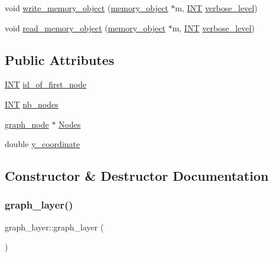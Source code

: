 \begin{DoxyCompactItemize}
\item 
void \mbox{\hyperlink{classgraph__layer_ac04a5403f452bec70405cec8a75ee6e7}{write\+\_\+memory\+\_\+object}} (\mbox{\hyperlink{classmemory__object}{memory\+\_\+object}} $\ast$m, \mbox{\hyperlink{galois_8h_a09fddde158a3a20bd2dcadb609de11dc}{I\+NT}} \mbox{\hyperlink{simeon_8_c_a818073fbcc2f439e7c56952f67386122}{verbose\+\_\+level}})
\item 
void \mbox{\hyperlink{classgraph__layer_aed94444b08a552c31e8b887c04a33b7f}{read\+\_\+memory\+\_\+object}} (\mbox{\hyperlink{classmemory__object}{memory\+\_\+object}} $\ast$m, \mbox{\hyperlink{galois_8h_a09fddde158a3a20bd2dcadb609de11dc}{I\+NT}} \mbox{\hyperlink{simeon_8_c_a818073fbcc2f439e7c56952f67386122}{verbose\+\_\+level}})
\end{DoxyCompactItemize}
\subsection*{Public Attributes}
\begin{DoxyCompactItemize}
\item 
\mbox{\hyperlink{galois_8h_a09fddde158a3a20bd2dcadb609de11dc}{I\+NT}} \mbox{\hyperlink{classgraph__layer_a8fdef3e79a5c98d05bcafaed5b41e11b}{id\+\_\+of\+\_\+first\+\_\+node}}
\item 
\mbox{\hyperlink{galois_8h_a09fddde158a3a20bd2dcadb609de11dc}{I\+NT}} \mbox{\hyperlink{classgraph__layer_aba70816fc271588e4393450b071460e0}{nb\+\_\+nodes}}
\item 
\mbox{\hyperlink{classgraph__node}{graph\+\_\+node}} $\ast$ \mbox{\hyperlink{classgraph__layer_a171dbfbfc7ce8a8eec093d9264f10e35}{Nodes}}
\item 
double \mbox{\hyperlink{classgraph__layer_aff095651d502f750af9d0f9fba2feb13}{y\+\_\+coordinate}}
\end{DoxyCompactItemize}


\subsection{Constructor \& Destructor Documentation}
\mbox{\label{classgraph__layer_a3b0f1d6cd9c014a467d51f7c7dad9a69}} 
\subsubsection{\texorpdfstring{graph\+\_\+layer()}{graph\_layer()}}
{\footnotesize\ttfamily graph\+\_\+layer\+::graph\+\_\+layer (\begin{DoxyParamCaption}{ }\end{DoxyParamCaption})}

